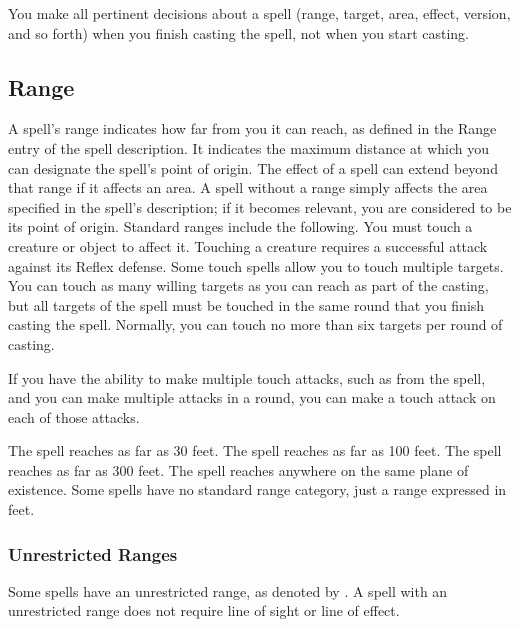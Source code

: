         You make all pertinent decisions about a spell (range, target, area, effect, version, and so forth) when you finish casting the spell, not when you start casting.

    \subsection{Range}
        A spell's range indicates how far from you it can reach, as defined in the Range entry of the spell description.
        It indicates the maximum distance at which you can designate the spell's point of origin.
        The effect of a spell can extend beyond that range if it affects an area.
        A spell without a range simply affects the area specified in the spell's description; if it becomes relevant, you are considered to be its point of origin.
        Standard ranges include the following.
         You must touch a creature or object to affect it.
        Touching a creature requires a successful attack against its Reflex defense.
        Some touch spells allow you to touch multiple targets.
        You can touch as many willing targets as you can reach as part of the casting, but all targets of the spell must be touched in the same round that you finish casting the spell.
        Normally, you can touch no more than six targets per round of casting.

        If you have the ability to make multiple touch attacks, such as from the  spell, and you can make multiple attacks in a round, you can make a touch attack on each of those attacks.

         The spell reaches as far as 30 feet.
         The spell reaches as far as 100 feet.
         The spell reaches as far as 300 feet.
         The spell reaches anywhere on the same plane of existence.
         Some spells have no standard range category, just a range expressed in feet.

        \subsubsection{Unrestricted Ranges}

            Some spells have an unrestricted range, as denoted by \rngunrestricted.
            A spell with an unrestricted range does not require line of sight or line of effect.


